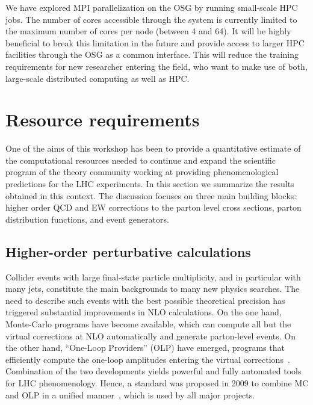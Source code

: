 We have explored MPI parallelization on the OSG by running small-scale 
HPC jobs. The number of cores accessible through the system is currently 
limited to the maximum number of cores per node (between 4 and 64). 
It will be highly beneficial to break this limitation in the future and
provide access to larger HPC facilities through the OSG as a common
interface.  This will reduce the training requirements for new
researcher entering the field, who want to make use of both,
large-scale distributed computing as well as HPC.

\section{Resource requirements}
\label{sec:requirements}

One of the aims of this workshop has been to provide a
quantitative estimate of the computational resources needed to
continue and expand the scientific program of the theory community
working at providing phenomenological predictions for the LHC
experiments. In this section we summarize the results obtained in
this context. The discussion focuses on three main building
blocks: higher order QCD and EW corrections to the parton level
cross sections, parton distribution functions, and event generators.

\subsection{Higher-order perturbative calculations}
\label{sec:nlo}

Collider events with large final-state particle multiplicity, and in particular 
with many jets, constitute the main backgrounds to many new physics searches.  
The need to describe such events with the best possible theoretical precision
has triggered substantial improvements in NLO calculations. 
On the one hand, Monte-Carlo programs have become available, which can compute 
all but the virtual corrections at NLO automatically and generate parton-level events. 
On the other hand, ``One-Loop Providers'' (OLP) have emerged, programs that 
efficiently compute the one-loop amplitudes entering the virtual corrections~\cite{
Berger:2008sj,Hahn:2000jm,Cullen:2011ac,Hirschi:2011pa,Cascioli:2011va,Reina:2011mb}. 
Combination of the two developments yields powerful and fully automated tools 
for LHC phenomenology. Hence, a standard was proposed in 2009 to combine MC and OLP 
in a unified manner~\cite{Binoth:2010xt}, which is used by all major projects.

